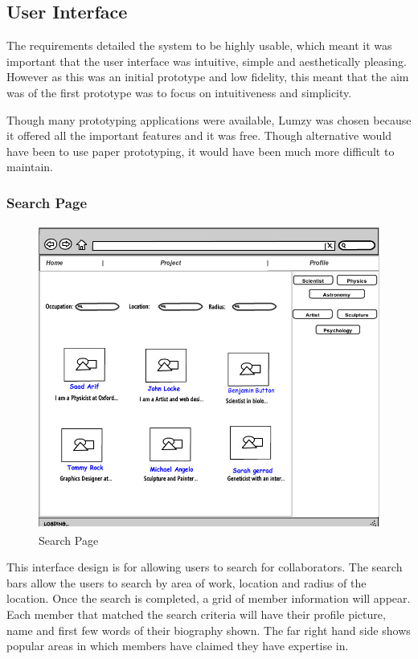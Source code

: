 \documentclass[a4paper,oneside,11pt]{report}
\begin{document}
\subsection{User Interface}
The requirements detailed the system to be highly usable, which meant it was important that the user interface was intuitive, simple and aesthetically pleasing. However as this was an initial prototype and low fidelity, this meant that the aim was of the first prototype was to focus on intuitiveness and simplicity.

Though many prototyping applications were available, Lumzy was chosen because it offered all the important features and it was free. Though alternative would have been to use paper prototyping, it would have been much more difficult to maintain.
\subsubsection{Search Page}
\begin{figure}[!ht]
\centering
\includegraphics[width=\textwidth,height=10cm]{People.jpg}
\caption{Search Page}
\end{figure}
This interface design is for allowing users to search for collaborators. The search bars allow the users to search by area of work, location and radius of the location.
Once the search is completed, a grid of member information will appear. Each member that matched the search criteria will have their profile picture, name and first few words of their biography shown. The far right hand side shows popular areas in which members have claimed they have expertise in.
\pagebreak
\end{document}

